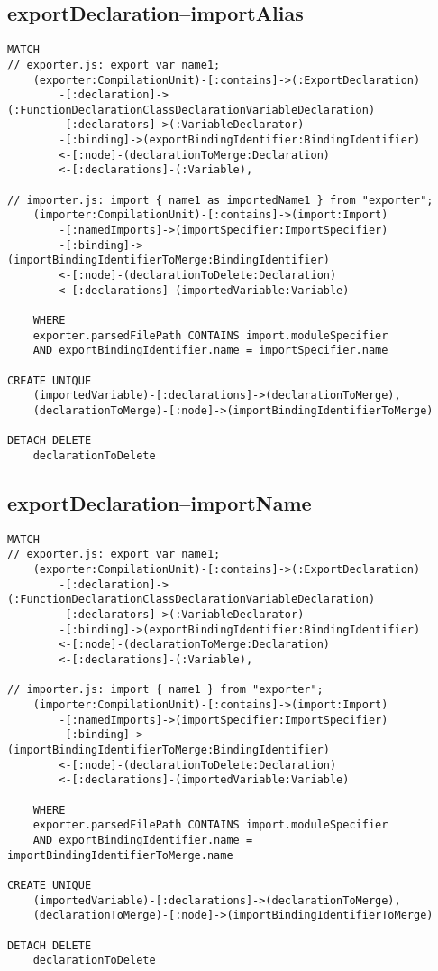 \newpage
\subsection{exportDeclaration–importAlias}
\begin{lstlisting}[language=Cypher]
MATCH
// exporter.js: export var name1;
    (exporter:CompilationUnit)-[:contains]->(:ExportDeclaration)
        -[:declaration]->(:FunctionDeclarationClassDeclarationVariableDeclaration)
        -[:declarators]->(:VariableDeclarator)
        -[:binding]->(exportBindingIdentifier:BindingIdentifier)
        <-[:node]-(declarationToMerge:Declaration)
        <-[:declarations]-(:Variable),

// importer.js: import { name1 as importedName1 } from "exporter";
    (importer:CompilationUnit)-[:contains]->(import:Import)
        -[:namedImports]->(importSpecifier:ImportSpecifier)
        -[:binding]->(importBindingIdentifierToMerge:BindingIdentifier)
        <-[:node]-(declarationToDelete:Declaration)
        <-[:declarations]-(importedVariable:Variable)

    WHERE
    exporter.parsedFilePath CONTAINS import.moduleSpecifier
    AND exportBindingIdentifier.name = importSpecifier.name

CREATE UNIQUE
    (importedVariable)-[:declarations]->(declarationToMerge),
    (declarationToMerge)-[:node]->(importBindingIdentifierToMerge)

DETACH DELETE
    declarationToDelete
\end{lstlisting}

\newpage
\subsection{exportDeclaration–importName}
\begin{lstlisting}[language=Cypher]
MATCH
// exporter.js: export var name1;
    (exporter:CompilationUnit)-[:contains]->(:ExportDeclaration)
        -[:declaration]->(:FunctionDeclarationClassDeclarationVariableDeclaration)
        -[:declarators]->(:VariableDeclarator)
        -[:binding]->(exportBindingIdentifier:BindingIdentifier)
        <-[:node]-(declarationToMerge:Declaration)
        <-[:declarations]-(:Variable),

// importer.js: import { name1 } from "exporter";
    (importer:CompilationUnit)-[:contains]->(import:Import)
        -[:namedImports]->(importSpecifier:ImportSpecifier)
        -[:binding]->(importBindingIdentifierToMerge:BindingIdentifier)
        <-[:node]-(declarationToDelete:Declaration)
        <-[:declarations]-(importedVariable:Variable)

    WHERE
    exporter.parsedFilePath CONTAINS import.moduleSpecifier
    AND exportBindingIdentifier.name = importBindingIdentifierToMerge.name

CREATE UNIQUE
    (importedVariable)-[:declarations]->(declarationToMerge),
    (declarationToMerge)-[:node]->(importBindingIdentifierToMerge)

DETACH DELETE
    declarationToDelete
\end{lstlisting}

